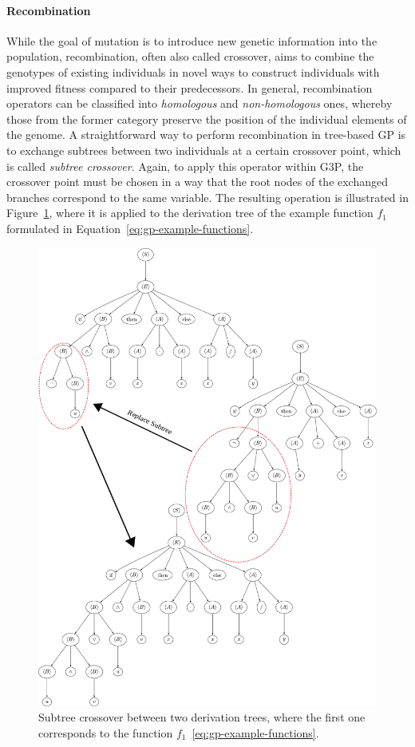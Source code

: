 \paragraph{Recombination}
While the goal of mutation is to introduce new genetic information into the population, recombination, often also called crossover, aims to combine the genotypes of existing individuals in novel ways to construct individuals with improved fitness compared to their predecessors.
In general, recombination operators can be classified into \emph{homologous} and \emph{non-homologous} ones, whereby those from the former category preserve the position of the individual elements of the genome.
A straightforward way to perform recombination in tree-based GP is to exchange subtrees between two individuals at a certain crossover point, which is called \emph{subtree crossover}.
Again, to apply this operator within G3P, the crossover point must be chosen in a way that the root nodes of the exchanged branches correspond to the same variable.
The resulting operation is illustrated in Figure~\ref{fig:gp-subtree-crossover}, where it is applied to the derivation tree of the example function $f_1$ formulated in Equation~\eqref{eq:gp-example-functions}.  
\begin{figure}[ht]
    \centering
	\includegraphics[scale=0.474]{figures/trees/subtree_crossover.pdf}
	\caption{Subtree crossover between two derivation trees, where the first one corresponds to the function $f_1$~\eqref{eq:gp-example-functions}.}
	\label{fig:gp-subtree-crossover}
\end{figure}
